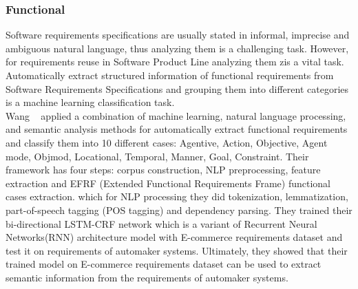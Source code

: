 \subsubsection{Functional}

Software requirements specifications are usually stated in informal, imprecise
and ambiguous natural language, thus analyzing them is a challenging task.
However, for requirements reuse in Software Product Line  analyzing them zis a vital task. Automatically extract
structured information of functional requirements from Software Requirements Specifications and grouping them into different
categories is a machine learning classification task\cite{7949577}. \\ 

Wang \etal~\cite{7949577} applied a combination of machine learning, natural
language processing, and semantic analysis methods for automatically extract functional requirements and classify
them into 10 different cases: Agentive, Action, Objective, Agent mode, Objmod, Locational, Temporal, Manner, Goal,
Constraint. Their framework has four steps: corpus construction,  NLP 
preprocessing, feature extraction and  EFRF (Extended Functional Requirements
Frame) functional cases extraction. which for NLP processing they did
tokenization,   lemmatization, part-of-speech tagging (POS  tagging) and
dependency parsing. They trained their bi-directional LSTM-CRF network which is
a variant of Recurrent Neural Networks(RNN) architecture model with E-commerce
requirements dataset and test it on requirements of automaker systems.
Ultimately, they showed that their trained model on E-commerce requirements
dataset can be used to extract semantic information from the requirements of
automaker systems.

